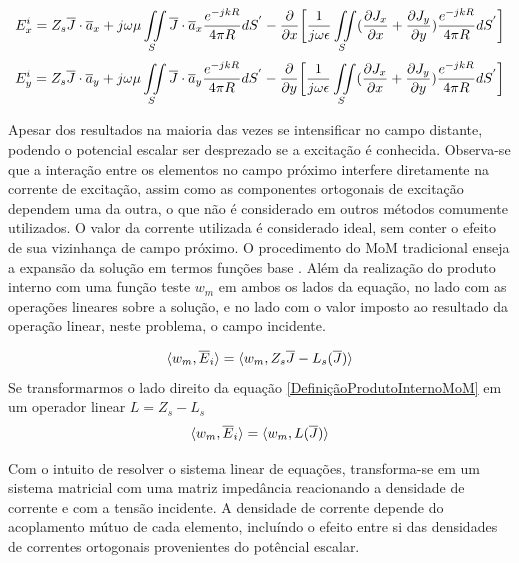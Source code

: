 \documentclass[
	12pt,				%
	openright,			%
	oneside,			%
	a4paper,			%
	english,			%
	brazil				%
	]{abntex2}
\begin{document}
\begin{equation}{\label{CampoExTangencialEmFunçãoJ}}
  E_{x}^i=Z_s \overline{J}\cdot \overline{a}_x+j\omega \mu \iint\limits_S \overline{J}\cdot \overline{a}_x\frac{e^{-j k R}}{4 \pi R} dS^{'} -
     \frac{\partial }{\partial x}  \biggl[ \frac{1}{j\omega \epsilon}\iint\limits_S  (\frac{\partial J_x}{\partial x}+ \frac{\partial J_y}{\partial y} ) \frac{e^{-j k R}}{4 \pi R} dS^{'}  \biggl] 
\end{equation}
\begin{equation}{\label{CampoEyTangencialEmFunçãoJ}}
  E_{y}^i=Z_s \overline{J}\cdot \overline{a}_y+j\omega \mu \iint\limits_S \overline{J}\cdot \overline{a}_y \frac{e^{-j k R}}{4 \pi R} dS^{'} -
     \frac{\partial }{\partial y}  \biggl[ \frac{1}{j\omega \epsilon}\iint\limits_S  (\frac{\partial J_x}{\partial x}+ \frac{\partial J_y}{\partial y} ) \frac{e^{-j k R}}{4 \pi R} dS^{'}  \biggl] 
\end{equation}

Apesar dos resultados na maioria das vezes se intensificar no campo distante, podendo o potencial escalar ser desprezado se a excitação é conhecida. Observa-se que a interação entre os elementos no campo próximo interfere diretamente na corrente de excitação, assim como as componentes ortogonais de excitação dependem uma da outra, o que não é considerado em outros métodos comumente utilizados. O valor da corrente utilizada é considerado ideal, sem conter o efeito de sua vizinhança de campo próximo.
O procedimento do MoM tradicional enseja a expansão da solução em termos funções base . Além da realização do produto interno com uma função teste $w_m$ em ambos os lados da equação, no lado com as operações lineares sobre a solução, e no lado com o valor imposto ao resultado da operação linear, neste problema, o campo incidente.

\begin{equation}{\label{DefiniçãoProdutoInternoMoM}}
    \langle w_m,\overline{E}_i \rangle=  \langle w_m,Z_s\overline{J}-L_s(\overline{J})\rangle
\end{equation}
Se transformarmos o lado direito da equação \ref{DefiniçãoProdutoInternoMoM} em um operador linear $L=Z_s -L_s$ 
\begin{equation}{\label{DefiniçãoProdutoInternoLMoM}}
 \langle w_m,\overline{E}_i \rangle=  \langle w_m,L(\overline{J})\rangle
\end{equation}

Com o intuito de resolver o sistema linear de equações, transforma-se em um sistema matricial com uma matriz impedância reacionando a densidade de corrente e com a tensão incidente. A densidade de corrente depende  do acoplamento mútuo de cada elemento, incluíndo o efeito entre si das densidades de correntes ortogonais provenientes do potêncial escalar. 
\end{document}
